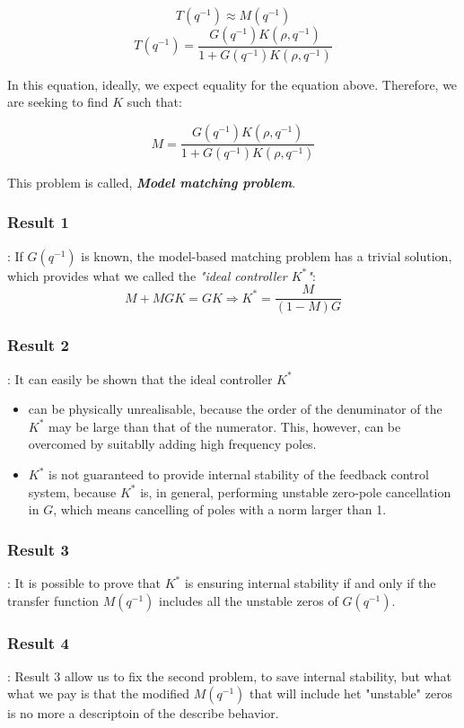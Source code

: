 \[
T(q^{-1}) \approx M(q^{-1})
\]
\[
T(q^{-1}) = \frac{G(q^{-1}) K(\rho,q^{-1})}{1+G(q^{-1}) K(\rho,q^{-1})}
\]

In this equation, ideally, we expect equality for the equation above. Therefore, we are seeking to find $K$ such that:

\[
M =  \frac{G(q^{-1}) K(\rho,q^{-1})}{1+G(q^{-1}) K(\rho,q^{-1})}
\]

This problem is called, \textbf{\textit{Model matching problem}}.

\subsubsection{Result 1}:
If $G(q^{-1})$ is known, the model-based matching problem has a trivial solution, which provides what we called the \textit{"ideal controller $K^{*}$"}:
\[
M + MGK = GK \Rightarrow K^{*} = \frac{M}{(1-M)G}
\]

\subsubsection{Result 2}:
It can easily be shown that the ideal controller $K^{*}$
\begin{itemize}
    \item can be physically unrealisable, because the order of the denuminator of the $K^{*}$ may be large than that of the numerator. This, however, can be overcomed by suitablly adding high frequency poles.
    \item $K^{*}$ is not guaranteed to provide internal stability of the feedback control system, because $K^{*}$ is, in general, performing unstable zero-pole cancellation in $G$, which means cancelling of poles with a norm larger than 1.
\end{itemize}

\subsubsection{Result 3}:
It is possible to prove that $K^{*}$ is ensuring internal stability if and only if the transfer function $M(q^{-1})$ includes all the unstable zeros of $G(q^{-1})$. \\

\subsubsection{Result 4}:
Result 3 allow us to fix the second problem, to save internal stability, but what what we pay is that the modified $M(q^{-1})$ that will include het "unstable" zeros is no more a descriptoin of the describe behavior.\\

